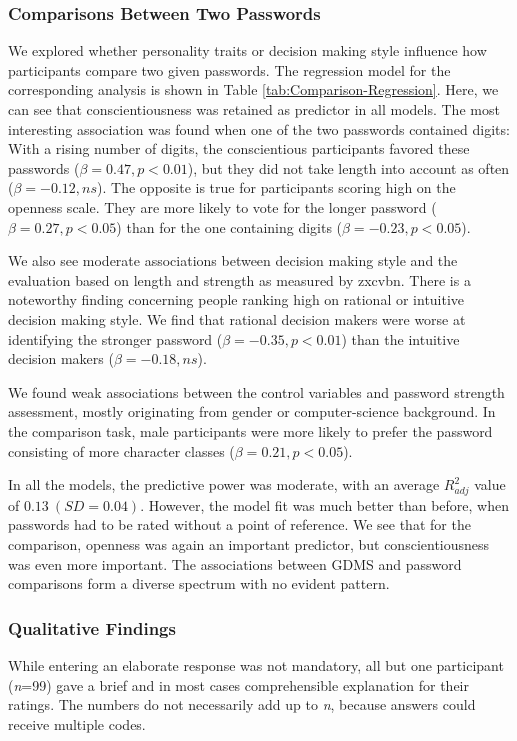 \subsubsection{Comparisons Between Two Passwords}
We explored whether personality traits or decision making style influence how participants compare two given passwords. The regression model for the corresponding analysis is shown in Table \ref{tab:Comparison-Regression}. Here, we can see that conscientiousness was retained as predictor in all models. The most interesting association was found when one of the two passwords contained digits: With a rising number of digits, the conscientious participants favored these passwords ($\beta = 0.47, p < 0.01$), but they did not take length into account as often ($\beta = -0.12, ns$). The opposite is true for participants scoring high on the openness scale. They are more likely to vote for the longer password ($\beta = 0.27, p < 0.05$) than for the one containing digits ($\beta = -0.23, p < 0.05$). 

We also see moderate associations between decision making style and the evaluation based on length and strength as measured by zxcvbn. There is a noteworthy finding concerning people ranking high on rational or intuitive decision making style. We find that rational decision makers were worse at identifying the stronger password ($\beta = -0.35, p < 0.01$) than the intuitive decision makers ($\beta = -0.18, ns$).  

We found weak associations between the control variables and password strength assessment, mostly originating from gender or computer-science background. In the comparison task, male participants were more likely to prefer the password consisting of more character classes ($\beta = 0.21, p < 0.05$). 

In all the models, the predictive power was moderate, with an average $R^2_{adj}$ value of $0.13~(SD=0.04)$. However, the model fit was much better than before, when passwords had to be rated without a point of reference. We see that for the comparison, openness was again an important predictor, but conscientiousness was even more important. The associations between GDMS and password comparisons form a diverse spectrum with no evident pattern. 



\subsubsection{Qualitative Findings}
While entering an elaborate response was not mandatory, all but one participant (\textit{n}=99) gave a brief and in most cases comprehensible explanation for their ratings. The numbers do not necessarily add up to \textit{n}, because answers could receive multiple codes.

